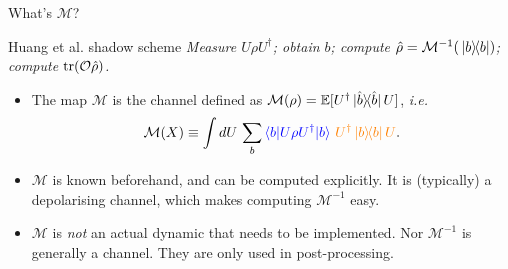 \documentclass{beamer}
\begin{document}
\begin{frame}{What's $\mathcal M$?}
    \begin{center}
    \begin{beamerboxesrounded}[shadow=true]{Huang et al. shadow scheme}
    \textit{
    Measure $U\rho U^\dagger$; 
    obtain $b$; 
    compute $\hat\rho=\mathcal M^{-1}(\ketbra*{b})$; 
    compute $\trace(\mathcal O\hat\rho)$.
    }
    \end{beamerboxesrounded}
    \end{center}
    \begin{itemize}\small
        \item The map $\mathcal M$ is the channel defined as $\mathcal M(\rho)=\mathbb{E}[U^\dagger \ketbra*{\hat b}U]$, \textit{i.e.}
        \begin{equation*}
        \mathcal M(X) \equiv \int dU\,
        \sum_b
        \textcolor{blue}{\langle b|U\rho U^\dagger|b\rangle}
        \,\, \textcolor{orange}{U^\dagger\ketbra*{b} U}.
        \end{equation*} \pause
        \item $\mathcal M$ is known beforehand, and can be computed explicitly. It is (typically) a depolarising channel, which makes computing $\mathcal M^{-1}$ easy.\pause
        \item \colorbox{yellow!15}{\parbox[t]{\dimexpr\linewidth-2\fboxsep}{$\mathcal M$ is \textit{not} an actual dynamic that needs to be implemented. Nor $\mathcal M^{-1}$ is generally a channel. They are only used in post-processing.}}
    \end{itemize}
\end{frame}
\end{document}
